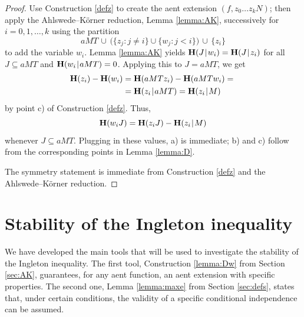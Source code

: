 \documentclass[10pt,a4paper]{amsart}
\def\|{\mskip1.5mu{|}\mskip1.5mu}
\def\H{\mathbf H}
\begin{document}
\begin{proof}
Use Construction \ref{defz} to create the aent extension $(f,z_0\dots z_k N)$; 
then apply the Ahlswede--K\"orner reduction, Lemma \ref{lemma:AK}, 
successively for $i=0,1,\dots,k$ using the partition
$$
   aMT\, \cup \, \big(\{z_j:j\neq i\}\cup\{w_j:j<i\}\big)\, \cup\, \{z_i\}
$$
to add the variable $w_i$. Lemma \ref{lemma:AK} yields
$\H(J\|w_i)=\H(J\|z_i)$ for all $J\subseteq aMT$ and $\H(w_i\|aMT)=0$.
Applying this to $J=aMT$, we get
\begin{align*}
   \H(z_i)-\H(w_i)&=\H(aMTz_i)-\H(aMTw_i) ={}\\
                  &=\H(z_i\|aMT)=\H(z_i\|M)
\end{align*}
by point c) of Construction \ref{defz}. Thus,
$$
  \H(w_iJ)=\H(z_iJ)-\H(z_i\|M)
$$
whenever $J\subseteq aMT$. Plugging in these values, a) is immediate; b) and
c) follow from the corresponding points in Lemma \ref{lemma:D}.

The symmetry statement is immediate from Construction \ref{defz} and the
Ahl\-swede--K\"orner reduction.
\end{proof}


\section{Stability of the Ingleton inequality}\label{sec:stab}

We have developed the main tools that will be used to investigate the
stability of the Ingleton inequality. The first tool, Construction
\ref{lemma:Dw} from Section \ref{sec:AK}, guarantees, for any aent function,
an aent extension with specific properties. The second one, Lemma
\ref{lemma:maxe} from Section \ref{sec:defs}, states that, under certain
conditions, the validity of a specific conditional independence can be
assumed.
\end{document}
